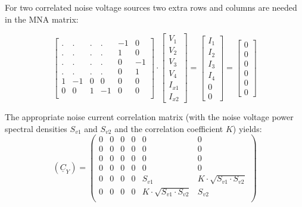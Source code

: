 For two correlated noise voltage sources two extra
rows and columns are needed in the MNA matrix:

\begin{equation}
\begin{bmatrix}
.&.&.&.& -1 &  0 \\
.&.&.&.&  1 &  0 \\
.&.&.&.&  0 & -1 \\
.&.&.&.&  0 &  1 \\
1 & -1 & 0 &  0 & 0 & 0 \\
0 &  0 & 1 & -1 & 0 & 0 \\
\end{bmatrix}
\cdot
\begin{bmatrix}
V_{1}\\
V_{2}\\
V_{3}\\
V_{4}\\
I_{x1}\\
I_{x2}
\end{bmatrix}
=
\begin{bmatrix}
I_{1}\\
I_{2}\\
I_{3}\\
I_{4}\\
0\\
0
\end{bmatrix}
=
\begin{bmatrix}
0\\
0\\
0\\
0\\
0\\
0
\end{bmatrix}
\end{equation}

The appropriate noise current correlation matrix (with the noise
voltage power spectral densities $S_{v1}$ and $S_{v2}$ and the
correlation coefficient $K$) yields:
\begin{equation}
(\underline{C}_Y) =
\begin{pmatrix}
 0 & 0 & 0 & 0 & 0 & 0\\
 0 & 0 & 0 & 0 & 0 & 0\\
 0 & 0 & 0 & 0 & 0 & 0\\
 0 & 0 & 0 & 0 & 0 & 0\\
 0 & 0 & 0 & 0 & S_{v1} & K\cdot\sqrt{S_{v1}\cdot S_{v2}}\\
 0 & 0 & 0 & 0 & K\cdot\sqrt{S_{v1}\cdot S_{v2}} & S_{v2}\\
\end{pmatrix}
\end{equation}

